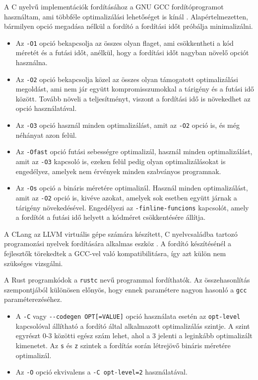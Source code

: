 A C nyelvű implementációk fordításához a GNU GCC fordítóprogramot használtam, ami többféle optimalizálási lehetőséget is kínál \cite{gcc}. Alapértelmezetten, bármilyen opció megadása nélkül a fordító a fordítási időt próbálja minimalizálni.
\begin{itemize}
  \item Az \lstinline{-O1} opció bekapcsolja az összes olyan flaget, ami csökkentheti a kód méretét és a futási időt, anélkül, hogy a fordítási időt nagyban növelő opciót használna.
  \item Az \lstinline{-O2} opció bekapcsolja közel az összes olyan támogatott optimalizálási megoldást, ami nem jár együtt kompromisszumokkal a tárigény és a futási idő között. Tovább növeli a teljesítményt, viszont a fordítási idő is növekedhet az opció használatával.
  \item Az \lstinline{-O3} opció használ minden optimalizálást, amit az \lstinline{-O2} opció is, és még néhányat azon felül.
  \item Az \lstinline{-Ofast} opció futási sebességre optimalizál, használ minden optimalizálást, amit az \lstinline{-O3} kapcsoló is, ezeken felül pedig olyan optimalizálásokat is engedélyez, amelyek nem érvények minden szabványos programnak.
  \item Az \lstinline{-Os} opció a bináris méretére optimalizál. Használ minden optimalizálást, amit az \lstinline{-O2} opció is, kivéve azokat, amelyek sok esetben együtt járnak a tárigény növekedésével. Engedélyezi az \lstinline{-finline-funcions} kapcsolót, amely a fordítót a futási idő helyett a kódméret csökkentésére állítja. 
\end{itemize}


A CLang az LLVM virtuális gépe számára készített, C nyelvcsaládba tartozó programozási nyelvek fordítására alkalmas eszköz \cite{llvm}.
A fordító készítésénél a fejlesztők törekedtek a GCC-vel való kompatibilitásra, így azt külön nem szükséges vizsgálni.

A Rust programkódok a \texttt{rustc} nevű programmal fordíthatók. Az összehasonlítás szempontjából különösen előnyös, hogy ennek paramétere nagyon hasonló a \texttt{gcc} paraméterezéséhez.
\begin{itemize}
  \item A \lstinline{-C} vagy \lstinline{--codegen OPT[=VALUE]} opció használata esetén az \lstinline{opt-level} kapcsolóval állítható a fordító által alkalmazott optimalizálás szintje. A szint egyrészt 0-3 közötti egész szám lehet, ahol a 3 jelenti a leginkább optimalizált kimenetet. Az \lstinline{s} és \lstinline{z} szintek a fordítás során létrejövő bináris méretére optimalizál.
  \item Az \lstinline{-O} opció ekvivalens a \lstinline{-C opt-level=2} használatával.
\end{itemize}

